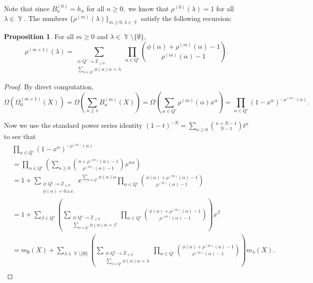 \documentclass[12pt,reqno]{amsart}
\theoremstyle{definition}
\newtheorem{prop}[thm]{Proposition}
\DeclareMathOperator{\Par}{\mathbb{Y}}
\begin{document}
Note that since $B^{(0)}_n = h_n$ for all $n \geq 0,$ we know that $\rho^{(0)}(\lambda) = 1$ for all $\lambda \in \Par.$ The numbers $\{ \rho^{(m)}(\lambda) \}_{m\geq 0, \lambda \in \Par}$ satisfy the following recursion:

\begin{prop}\label{monomial recursion prop} For all $m \geq 0$ and $\lambda \in \Par \setminus \{ \emptyset \},$
    $$\rho^{(m+1)}(\lambda) = \sum_{\substack{\phi:Q'\rightarrow \mathbb{Z}_{\geq 0} \\ \sum_{\alpha \in Q'} \phi(\alpha)\alpha = \lambda}} \prod_{\alpha \in Q'} \binom{\phi(\alpha) + \rho^{(m)}(\alpha)-1}{\rho^{(m)}(\alpha)-1}.$$
\end{prop}
\begin{proof}
By direct computation,
$$\Omega\left( \Omega^{(m+1)}_0(X) \right)=\Omega\left( \sum_{n \geq 1} B_n^{(m)}(X) \right)= \Omega\left( \sum_{\alpha \in Q'} \rho^{(m)}(\alpha) x^{\alpha} \right)= \prod_{\alpha \in  Q'} \left( 1-x^{\alpha} \right)^{-\rho^{(m)}(\alpha)}.$$
    
Now we use the standard power series identity 
$(1-t)^{-N} = \sum_{n \geq 0} \binom{n+N-1}{N-1} t^n$ to see that
        \begin{align*}
        & \prod_{\alpha \in  Q'} \left( 1-x^{\alpha} \right)^{-\rho^{(m)}(\alpha)} \\
        &= \prod_{\alpha \in  Q'} \left( \sum_{n \geq 0} \binom{n+\rho^{(m)}(\alpha)-1}{\rho^{(m)}(\alpha)-1}  x^{n \alpha}\right) \\
        &= 1+ \sum_{\substack{\phi: Q' \rightarrow \mathbb{Z}_{\geq 0} \\ \phi(\alpha) = 0 ~\text{a.e.}}} x^{\sum_{\alpha \in Q' } \phi(
        \alpha)\alpha} \prod_{\alpha\in Q'} \binom{\phi(\alpha)+\rho^{(m)}(\alpha)-1}{\rho^{(m)}(\alpha)-1} \\
        &= 1 + \sum_{\beta \in Q'} \left( \sum_{\substack{\phi: Q' \rightarrow \mathbb{Z}_{\geq 0} \\ \sum_{\alpha \in Q' } \phi(\alpha) \alpha = \beta}} \prod_{\alpha\in Q'} \binom{\phi(\alpha)+\rho^{(m)}(\alpha)-1}{\rho^{(m)}(\alpha)-1} \right) x^{\beta} \\
        &= m_{\emptyset}(X) + \sum_{\lambda \in \Par \setminus \{\emptyset \}} \left( \sum_{\substack{\phi: Q' \rightarrow \mathbb{Z}_{\geq 0} \\ \sum_{\alpha \in Q' } \phi(\alpha) \alpha = \lambda}} \prod_{\alpha\in Q'} \binom{\phi(\alpha)+\rho^{(m)}(\alpha)-1}{\rho^{(m)}(\alpha)-1} \right) m_{\lambda}(X).\\
    \end{align*}
\end{proof}
\end{document}

